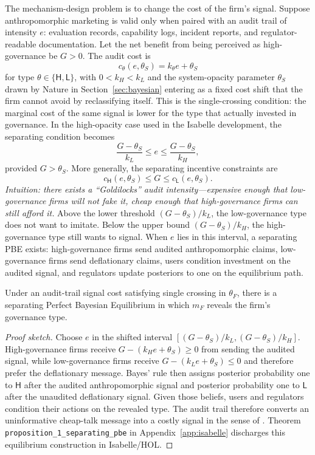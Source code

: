 The mechanism-design problem is to change the cost of the firm's signal. Suppose
anthropomorphic marketing is valid only when paired with an audit trail of
intensity $e$: evaluation records, capability logs, incident reports, and
regulator-readable documentation. Let the net benefit from being perceived as
high-governance be $G>0$. The audit cost is
\[
c_\theta(e,\theta_S)=k_\theta e+\theta_S
\]
for type $\theta\in\{\mathsf{H},\mathsf{L}\}$, with $0<k_H<k_L$ and the
system-opacity parameter $\theta_S$ drawn by Nature in Section~\ref{sec:bayesian}
entering as a fixed cost shift that the firm cannot avoid by reclassifying
itself. This is the single-crossing condition: the marginal cost of the same
signal is lower for the type that actually invested in governance. In the
high-opacity case used in the Isabelle development, the separating condition
becomes
\[
\frac{G-\theta_S}{k_L} \leq e \leq \frac{G-\theta_S}{k_H},
\]
provided $G>\theta_S$. More generally, the separating incentive constraints are
\[
c_\mathsf{H}(e,\theta_S)\leq G \leq c_\mathsf{L}(e,\theta_S).
\]
\emph{Intuition: there exists a ``Goldilocks'' audit intensity---expensive enough that low-governance firms will not fake it, cheap enough that high-governance firms can still afford it.}
Above the lower threshold $(G-\theta_S)/k_L$, the low-governance type does not
want to imitate. Below the upper bound $(G-\theta_S)/k_H$, the high-governance
type still wants to signal. When $e$ lies in this interval, a separating PBE exists:
high-governance firms send audited anthropomorphic claims, low-governance firms send
deflationary claims, users condition investment on the audited signal, and
regulators update posteriors to one on the equilibrium path.

\begin{proposition}
\label{prop:audit-trail-separation}
Under an audit-trail signal cost satisfying single crossing in $\theta_F$,
there is a separating Perfect Bayesian Equilibrium in which $m_F$ reveals the
firm's governance type.
\end{proposition}

\begin{proof}[Proof sketch]
Choose $e$ in the shifted interval
$[(G-\theta_S)/k_L,(G-\theta_S)/k_H]$. High-governance firms receive
$G-(k_He+\theta_S)\geq 0$ from sending the audited signal, while low-governance
firms receive $G-(k_Le+\theta_S)\leq 0$ and therefore prefer the deflationary
message. Bayes' rule then assigns posterior probability one to $\mathsf{H}$
after the audited anthropomorphic signal and posterior probability one to
$\mathsf{L}$ after the unaudited deflationary signal. Given those beliefs,
users and regulators condition their actions on the revealed type.
The audit trail therefore converts an uninformative cheap-talk message into a
costly signal in the sense of \citet{spence1973}. Theorem \texttt{proposition\_\allowbreak{}1\_\allowbreak{}separating\_\allowbreak{}pbe} in Appendix~\ref{app:isabelle} discharges this equilibrium construction in Isabelle/HOL.
\end{proof}
